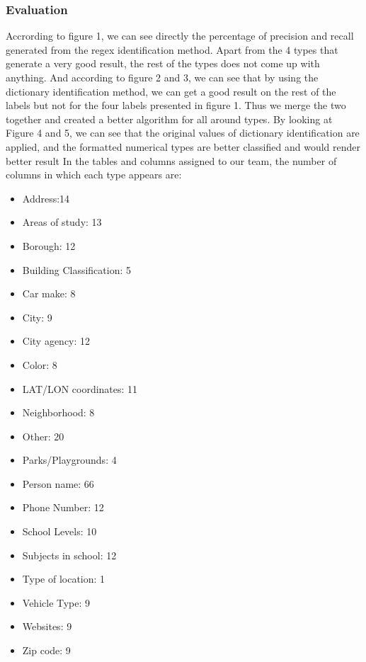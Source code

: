 \documentclass[sigconf]{acmart}
\begin{document}
\subsubsection{Evaluation}
Accrording to figure 1, we can see directly the percentage of precision and recall generated from the regex identification method. Apart from the 4 types that generate a very good result, the rest of the types does not come up with anything.
And according to figure 2 and 3, we can see that by using the dictionary identification method, we can get a good result on the rest of the labels but not for the four labels presented in figure 1. Thus we merge the two together and created a better algorithm for all around types.
By looking at Figure 4 and 5, we can see that the original values of dictionary identification are applied, and the formatted numerical types are better classified and would render better result
In the tables and columns assigned to our team, the number of columns in which each type appears are:
\begin{itemize}
\item {Address}:14
\item {Areas of study}: 13
\item {Borough}: 12
\item {Building Classification}: 5
\item {Car make}: 8
\item {City}: 9
\item {City agency}: 12
\item {Color}: 8
\item {LAT/LON coordinates}: 11
\item {Neighborhood}: 8
\item {Other}: 20
\item {Parks/Playgrounds}: 4
\item {Person name}: 66
\item {Phone Number}: 12
\item {School Levels}: 10
\item {Subjects in school}: 12
\item {Type of location}: 1
\item {Vehicle Type}: 9
\item {Websites}: 9
\item {Zip code}: 9

\end{itemize}
\end{document}

